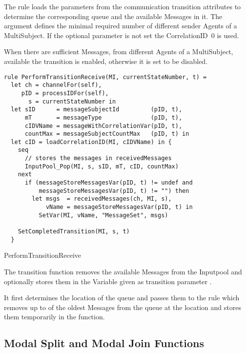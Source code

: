The  rule loads the parameters from the communication transition attributes
to determine the corresponding queue and the available Messages in it. The
 argument defines the minimal required
number of different sender Agents of a MultiSubject. If the optional
parameter  is not set the
CorrelationID~0 is used.

When there are sufficient Messages, from different Agents of a MultiSubject,
available the transition is enabled, otherwise it is set to be disabled.



\begin{listing}[H]
\begin{verbatim}
rule PerformTransitionReceive(MI, currentStateNumber, t) =
  let ch = channelFor(self),
     pID = processIDFor(self),
       s = currentStateNumber in
  let sID      = messageSubjectId         (pID, t),
      mT       = messageType              (pID, t),
      cIDVName = messageWithCorrelationVar(pID, t),
      countMax = messageSubjectCountMax   (pID, t) in
  let cID = loadCorrelationID(MI, cIDVName) in {
    seq
      // stores the messages in receivedMessages
      InputPool_Pop(MI, s, sID, mT, cID, countMax)
    next
      if (messageStoreMessagesVar(pID, t) != undef and
          messageStoreMessagesVar(pID, t) != "") then
        let msgs  = receivedMessages(ch, MI, s),
            vName = messageStoreMessagesVar(pID, t) in
          SetVar(MI, vName, "MessageSet", msgs)

    SetCompletedTransition(MI, s, t)
  }
\end{verbatim}
\caption{PerformTransitionReceive}
\label{lst:shortasm:PerformTransitionReceive}
\end{listing}

The transition function removes the available Messages from the Inputpool and
optionally stores them in the Variable given as transition parameter
.

It first determines the location of the queue and passes them to the
 rule which removes up to 
of the oldest Messages from the queue at the location
and stores them temporarily in the  function.


\subsection{Modal Split and Modal Join Functions}


